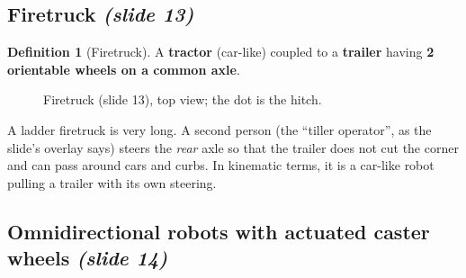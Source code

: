 \documentclass[11pt,a4paper]{article}
\newcommand{\fixedwheel}[2]{\begin{scope}[shift={(#1)},rotate=#2]
  \draw[fill=gray!30] (-0.3,-0.07) rectangle (0.3,0.07);\end{scope}}
\newcommand{\orientwheel}[2]{\begin{scope}[shift={(#1)},rotate=#2]
  \draw[pattern=north east lines] (-0.3,-0.07) rectangle (0.3,0.07);
  \fill (0,0) circle (1pt);\end{scope}}
\theoremstyle{definition}
\newtheorem{definition}{Definition}[section]
\theoremstyle{plain}
\theoremstyle{remark}
\begin{document}
\subsection{Firetruck \emph{(slide 13)}}

\begin{definition}[Firetruck]
A \textbf{tractor} (car-like) coupled to a \textbf{trailer} having \textbf{2 orientable wheels on a common axle}.
\end{definition}

\begin{figure}[H]
\centering
{}
\caption{Firetruck (slide 13), top view; the dot is the hitch.}
\end{figure}

\begin{intuition}
A ladder firetruck is very long. A second person (the ``tiller operator'', as the slide's overlay says) steers the \emph{rear} axle so that the trailer does not cut the corner and can pass around cars and curbs. In kinematic terms, it is a car-like robot pulling a trailer with its own steering.
\end{intuition}

\subsection{Omnidirectional robots with actuated caster wheels \emph{(slide 14)}}
\end{document}
